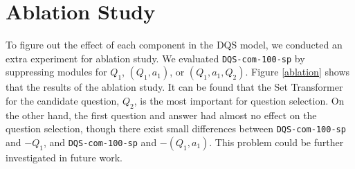 \section{Ablation Study}
\label{sq:ablation_study}


To figure out the effect of each component in the DQS model, 
we conducted an extra experiment for ablation study. 
We evaluated \texttt{DQS-com-100-sp} 
by suppressing modules for $Q_1$, $(Q_1, a_1)$, or $(Q_1, a_1, Q_2)$. 
Figure \ref{ablation} shows that the results of the ablation study. 
It can be found that the Set Transformer for the candidate question, $Q_2$, is the most important for question selection. 
On the other hand, 
the first question and answer had almost no effect on the question selection,
though there exist small differences between \texttt{DQS-com-100-sp} and $-Q_1$, and \texttt{DQS-com-100-sp} and $-(Q_1, a_1)$. 
This problem could be further investigated in future work.